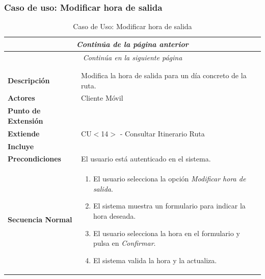 \subsubsection*{Caso de uso: Modificar hora de salida }
\begin{longtable}{| p{4cm} | p{10cm} |}
\endfirsthead
\multicolumn{2}{c}{\textit{Continúa de la página anterior}}\\[12pt]
\hline
\endhead
\hline
\multicolumn{2}{c}{\textit{Continúa en la siguiente página}} \\
\endfoot
\hline
\caption{Caso de Uso: Modificar hora de salida}\label{fig:1}\\
\endlastfoot


\hline
\multicolumn{2}{|c|}{\textbf{CU$<$16$>$ - Modificar Hora de Salida}} \\

\hline
\textbf{Descripción} &
Modifica la hora de salida para un día concreto de la ruta.\\

\hline
\textbf{Actores} &
Cliente Móvil\\

\hline
\textbf{Punto de Extensión} &
\\

\hline
\textbf{Extiende} &
CU$<$14$>$ - Consultar Itinerario Ruta
\\

\hline
\textbf{Incluye} &
\\

\hline
\textbf{Precondiciones} &
El usuario está autenticado en el sistema.\\

\hline
\textbf{Secuencia Normal} &\mbox{}\par\vspace{-\baselineskip}
\begin{enumerate}[leftmargin=0.7cm, topsep=0.1cm]
\item El usuario selecciona la opción \textit{Modificar hora de salida}.
\item El sistema muestra un formulario para indicar la hora deseada.
\item El usuario selecciona la hora en el formulario y pulsa en \textit{Confirmar}.
\item El sistema valida la hora y la actualiza.
\end{enumerate}



\end{longtable}

